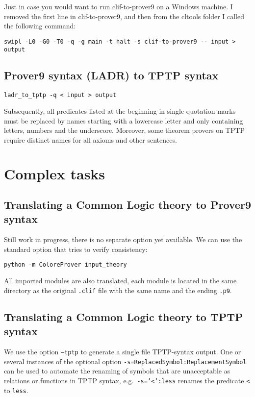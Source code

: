 \documentclass{article}
\begin{document}
Just in case you would want to run clif-to-prover9 on a Windows machine. I removed the first line in clif-to-prover9, and then from the cltools folder I called the following command: 

\begin{verbatim}
swipl -L0 -G0 -T0 -q -g main -t halt -s clif-to-prover9 -- input > output
\end{verbatim}


\subsection{Prover9 syntax (LADR) to TPTP syntax}

\begin{verbatim}
ladr_to_tptp -q < input > output
\end{verbatim}

Subsequently, all predicates listed at the beginning in single quotation marks must be replaced by names starting with a lowercase letter and only containing letters, numbers and the underscore. Moreover, some theorem provers on TPTP require distinct names for all axioms and other sentences.


\section{Complex tasks}


\subsection{Translating a Common Logic theory to Prover9 syntax}

Still work in progress, there is no separate option yet available.
We can use the standard option that tries to verify consistency:

\begin{verbatim}
python -m ColoreProver input_theory
\end{verbatim}

All imported modules are also translated, each module is located in the same directory as the original \texttt{.clif} file with the same name and the ending \texttt{.p9}.


\subsection{Translating a Common Logic theory to TPTP syntax}

We use the option \texttt{--tptp} to generate a single file TPTP-syntax output. One or several instances of the optional option \texttt{-s=ReplacedSymbol:ReplacementSymbol} can be used to automate the renaming of symbols that are unacceptable as relations or functions in TPTP syntax, e.g.\ \texttt{-s='<':less} renames the predicate \texttt{<} to \texttt{less}.
\end{document}
